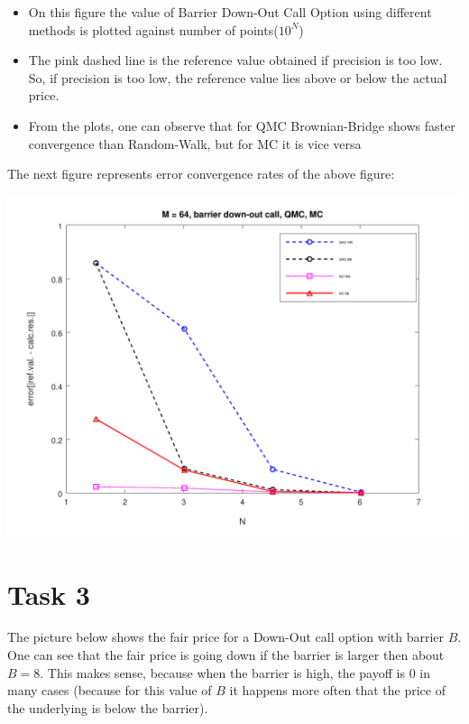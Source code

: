 \documentclass[10pt,a4paper]{article}
\begin{document}
\begin{itemize}
    \item{On this figure the value of Barrier Down-Out Call Option using different methods is plotted against number of points($10^N$)
    }
\item{
The pink dashed line is the reference value obtained if precision is too low. So, if precision is too low, the reference value lies above or below the actual price.
}
\item{
From the plots, one can observe that for QMC Brownian-Bridge shows faster convergence than Random-Walk, but for MC it is vice versa
}
\end{itemize}
\newpage
The next figure represents error convergence rates of the above figure:

\begin{center}
	\includegraphics[scale=0.35]{images/task2_error.png}
\end{center}

\section*{Task 3}

The picture below shows the fair price for a Down-Out call option with barrier $B$. One can see that the fair price is going down if the barrier is larger then about $B=8$. This makes sense, because when the barrier is high, the payoff is $0$ in many cases (because for this value of $B$ it happens more often that the price of the underlying is below the barrier).
\end{document}
